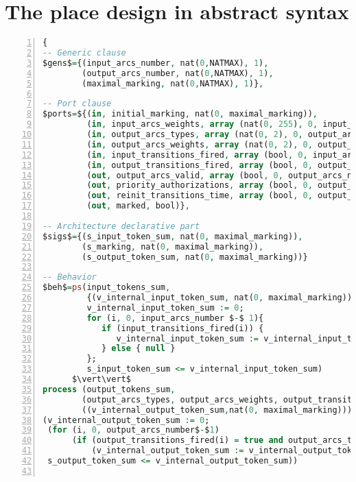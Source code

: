 \section{The place design in abstract \hvhdl{} syntax}
\label{app:place-design}

\begin{lstlisting}[language=VHDL,label={lst:place-design-abss},caption={The \texttt{place} design in \hvhdl{} abstract syntax.},framexleftmargin=1.5em,xleftmargin=2em,numbers=left, numberstyle=\tiny\ttfamily]
{
-- Generic clause
$gens$={(input_arcs_number, nat(0,NATMAX), 1), 
        (output_arcs_number, nat(0,NATMAX), 1),
        (maximal_marking, nat(0,NATMAX), 1)},

-- Port clause
$ports=${(in, initial_marking, nat(0, maximal_marking)),
         (in, input_arcs_weights, array (nat(0, 255), 0, input_arcs_number$-$1)),
         (in, output_arcs_types, array (nat(0, 2), 0, output_arcs_number$-$1)),
         (in, output_arcs_weights, array (nat(0, 2), 0, output_arcs_number$-$1)),
         (in, input_transitions_fired, array (bool, 0, input_arcs_number$-$1)),          
         (in, output_transitions_fired, array (bool, 0, output_arcs_number$-$1)),
         (out, output_arcs_valid, array (bool, 0, output_arcs_number$-$1)),
         (out, priority_authorizations, array (bool, 0, output_arcs_number$-$1)),
         (out, reinit_transitions_time, array (bool, 0, output_arcs_number$-$1)),
         (out, marked, bool)},
   
-- Architecture declarative part
$sigs$={(s_input_token_sum, nat(0, maximal_marking)),
        (s_marking, nat(0, maximal_marking)),
        (s_output_token_sum, nat(0, maximal_marking))}
       
-- Behavior  
$beh$=ps(input_tokens_sum, 
         {(v_internal_input_token_sum, nat(0, maximal_marking))},
         v_internal_input_token_sum := 0;
         for (i, 0, input_arcs_number $-$ 1){
            if (input_transitions_fired(i)) { 
               v_internal_input_token_sum := v_internal_input_token_sum + input_arcs_weights(i) 
            } else { null }
         };
         s_input_token_sum <= v_internal_input_token_sum)
      $\vert\vert$
process (output_tokens_sum, 
        (output_arcs_types, output_arcs_weights, output_transitions_fired),
        ((v_internal_output_token_sum,nat(0, maximal_marking))),
(v_internal_output_token_sum := 0;
 (for (i, 0, output_arcs_number$-$1)
      (if (output_transitions_fired(i) = true and output_arcs_types(i) = 0)
          (v_internal_output_token_sum := v_internal_output_token_sum + output_arcs_weights(i))));
 s_output_token_sum <= v_internal_output_token_sum))
    

\end{lstlisting}
